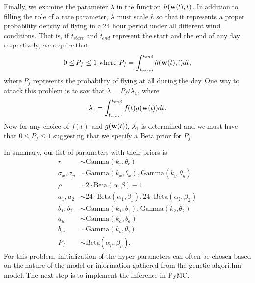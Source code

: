 \documentclass[12pt,english]{article}
\begin{document}
Finally, we examine the parameter $\lambda$ in the function $h(\mathbf{w}(t),t)$. In addition to filling the role of a rate parameter, $\lambda$ must scale $h$ so that it represents a proper probability density of flying in a 24 hour period under all different wind conditions. That is, if $t_{start}$ and $t_{end}$ represent the start and the end of any day respectively, we require that
\begin{equation}
0\leq P_f\leq 1 \mbox{ where } P_f = \int_{t_{start}}^{t_{end}}h(\mathbf{w}(t),t)dt,
\end{equation}
where $P_f$ represents the probability of flying at all during the day. One way to attack this problem is to say that $\lambda=P_f/\lambda_1$, where
\begin{equation}
\lambda_1 = \int_{t_{start}}^{t_{end}}f(t)g(\mathbf{w}(t))dt.
\end{equation}
Now for any choice of $f(t)$ and $g(\mathbf{w}(t))$, $\lambda_1$ is determined and we must have that $0\leq P_f\leq 1$ suggesting that we specify a Beta prior for $P_f$.

In summary, our list of parameters with their priors is
\begin{align*}
r &\sim \mbox{Gamma}(k_r,\theta_r)\\
\sigma_x, \sigma_y &\sim \mbox{Gamma}(k_x,\theta_x), \mbox{Gamma}(k_y,\theta_y)\\
\rho &\sim 2\cdot\mbox{Beta}(\alpha,\beta)-1\\
a_1, a_2 &\sim 24\cdot\mbox{Beta}(\alpha_1,\beta_1), 24\cdot\mbox{Beta}(\alpha_2,\beta_2)\\
b_1, b_2 &\sim \mbox{Gamma}(k_1,\theta_1), \mbox{Gamma}(k_2,\theta_2)\\
a_w &\sim \mbox{Gamma}(k_a,\theta_a)\\
b_w &\sim \mbox{Gamma}(k_b,\theta_b)\\
P_f &\sim \mbox{Beta}(\alpha_p,\beta_p).
\end{align*}
For this problem, initialization of the hyper-parameters can often be chosen based on the nature of the model or information gathered from the genetic algorithm model. The next step is to implement the inference in PyMC.
\end{document}
